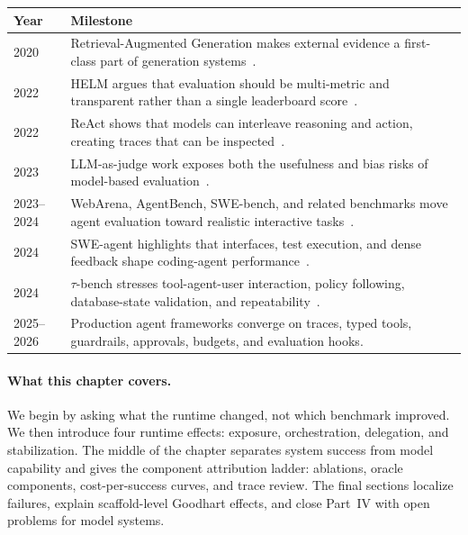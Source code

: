 \begin{center}
\begin{tabularx}{\textwidth}{@{}lX@{}}
\toprule
\textbf{Year} & \textbf{Milestone} \\
\midrule
2020 & Retrieval-Augmented Generation makes external evidence a first-class part of generation systems~\cite{lewis2020rag}. \\
2022 & HELM argues that evaluation should be multi-metric and transparent rather than a single leaderboard score~\cite{liang2022helm}. \\
2022 & ReAct shows that models can interleave reasoning and action, creating traces that can be inspected~\cite{yao2023react}. \\
2023 & LLM-as-judge work exposes both the usefulness and bias risks of model-based evaluation~\cite{zheng2023judging}. \\
2023--2024 & WebArena, AgentBench, SWE-bench, and related benchmarks move agent evaluation toward realistic interactive tasks~\cite{zhou2023webarena,liu2023agentbench,jimenez2024swebench}. \\
2024 & SWE-agent highlights that interfaces, test execution, and dense feedback shape coding-agent performance~\cite{yang2024sweagent}. \\
2024 & \(\tau\)-bench stresses tool-agent-user interaction, policy following, database-state validation, and repeatability~\cite{yao2024taubench}. \\
2025--2026 & Production agent frameworks converge on traces, typed tools, guardrails, approvals, budgets, and evaluation hooks. \\
\bottomrule
\end{tabularx}
\end{center}

\paragraph{What this chapter covers.} We begin by asking what the runtime changed, not which benchmark improved. We then introduce four runtime effects: exposure, orchestration, delegation, and stabilization. The middle of the chapter separates system success from model capability and gives the component attribution ladder: ablations, oracle components, cost-per-success curves, and trace review. The final sections localize failures, explain scaffold-level Goodhart effects, and close Part~IV with open problems for model systems.


